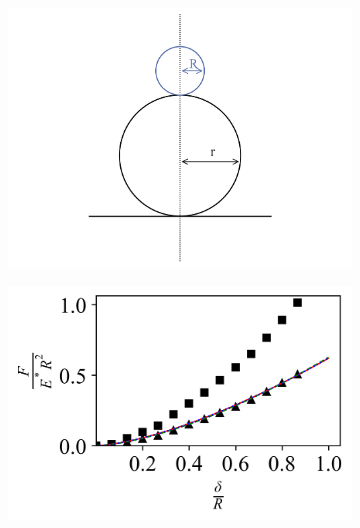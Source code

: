 \begin{figure}[H]
\centering

    \begin{subfigure}[t]{0.32\textwidth}
        \centering
        \caption{\label{fig: Sphere-Sphere-Setup}}
        \includegraphics[width=1\linewidth]{Figures/Sphere-Sphere-Setup.png}
    \end{subfigure}
    \hfill
    \begin{subfigure}[t]{0.32\textwidth}
         \centering
        \caption{\label{fig: Sphere-Sphere-Contact_Models} }
         \includegraphics[width=1\linewidth]{Figures/Sphere-Sphere-Contact_Models.png}
    \end{subfigure}
    \hfill
    \begin{subfigure}[t]{0.32\textwidth}
        \centering

\end{subfigure}
\end{figure}
